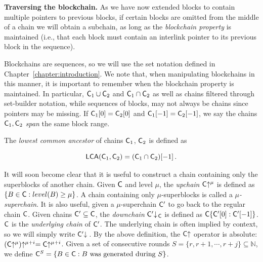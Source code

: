 

\noindent\textbf{Traversing the blockchain. }
As we have now extended blocks to contain multiple pointers to previous blocks,
if certain blocks are omitted from the middle of a chain we will obtain a
subchain, as long as the \emph{blockchain property} is maintained (i.e., that
each block must contain an interlink pointer to its previous block in the
sequence).

Blockchains are sequences, so we will use the set notation defined in
Chapter~\ref{chapter:introduction}. We note that, when manipulating blockchains
in this manner, it is important to remember when the blockchain property is
maintained. In particular, $\mathsf{C}_1 \cup \mathsf{C}_2$ and $\mathsf{C}_1 \cap \mathsf{C}_2$
as well as chains filtered through set-builder notation,
while sequences of blocks, may not always be chains since pointers may be missing.
If $\mathsf{C}_1[0] = \mathsf{C}_2[0]$ and $\mathsf{C}_1[-1]
= \mathsf{C}_2[-1]$, we say the chains $\mathsf{C}_1, \mathsf{C}_2$ \emph{span} the same
block range.

\begin{definition}
The \emph{lowest common ancestor} of chains $\mathsf{C}_1$, $\mathsf{C}_2$ is defined as

\[
\textsf{LCA}(\mathsf{C}_1, \mathsf{C}_2) = (\mathsf{C}_1 \cap \mathsf{C}_2)[-1]\,.
\]
\end{definition}

It will soon become clear that it is useful to construct a chain containing only
the superblocks of another chain. Given $\mathsf{C}$ and level $\mu$, the
\emph{upchain} $\mathsf{C}\negthickspace\uparrow^\mu$ is defined as $\{B \in \mathsf{C}: level(B)
\geq \mu\}$. A chain containing only $\mu$-superblocks is called a
$\mu$\emph{-superchain}. It is also useful, given a $\mu$-superchain $\mathsf{C}'$
to go back to the regular chain $\mathsf{C}$. Given chains $\mathsf{C}' \subseteq
\mathsf{C}$, the \emph{downchain} $\mathsf{C}'\negthickspace\downarrow\,\!\!_{\mathsf{C}}$ is defined as
$\mathsf{C}\{\mathsf{C}'[0]:\mathsf{C}'[-1]\}$. $\mathsf{C}$ is the \emph{underlying chain} of
$\mathsf{C}'$. The underlying chain is often implied by context, so we will simply
write $\mathsf{C}'\negthickspace\downarrow\,$. By the above definition, the $\mathsf{C}\negthickspace\uparrow$
operator is absolute: $(\mathsf{C}\negthickspace\uparrow^\mu)\negthickspace\uparrow^{\mu + i} =
\mathsf{C}\negthickspace\uparrow^{\mu + i}$. Given a set of consecutive rounds $S = \{r, r + 1,
\cdots, r + j\} \subseteq \mathbb{N}$, we define $\mathsf{C}^S = \{B \in \mathsf{C}: B
\text{ was generated during } S\}$.
